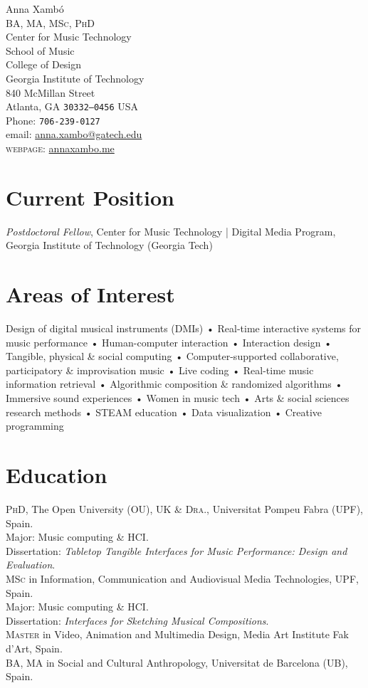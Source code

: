 \documentclass[10pt, a4paper]{article}
\newcommand{\years}[1]{\marginnote{\scriptsize #1}}
\begin{document}
{\Huge Anna Xambó}\\[0.1cm]
\textsc{BA, MA, MSc, PhD}\\[1cm]
Center for Music Technology\\
School of Music\\
College of Design\\
Georgia Institute of Technology\\
840 McMillan Street\\
Atlanta, GA  \texttt{30332--0456}
USA\\[.2cm]
Phone: \texttt{706-239-0127}\\
email: \href{mailto:anna.xambo@gatech.edu}{anna.xambo@gatech.edu}\\
\textsc{webpage}: \href{http://annaxambo.me/}{annaxambo.me}\\ 

\section*{Current Position}
\emph{Postdoctoral Fellow}, Center for Music Technology | Digital Media Program, Georgia Institute of Technology (Georgia Tech)

\section*{Areas of Interest}
Design of digital musical instruments (DMIs) • Real-time interactive systems for music performance • Human-computer interaction • Interaction design • Tangible, physical \& social computing • Computer-supported collaborative, participatory \& improvisation music • Live coding • Real-time music information retrieval • Algorithmic composition \& randomized algorithms • Immersive sound experiences • Women in music tech • Arts \& social sciences research methods • STEAM education • Data visualization • Creative programming 

\section*{Education}
\noindent
\years{2015}\textsc{PhD}, The Open University (OU), UK \& \textsc{Dra.}, Universitat Pompeu Fabra (UPF), Spain.\\
Major: Music computing \& HCI.\\ 
Dissertation: \emph{Tabletop Tangible Interfaces for Music Performance: Design and Evaluation}.\\
\years{2008}\textsc{MSc} in Information, Communication and Audiovisual Media Technologies, UPF, Spain.\\
Major: Music computing \& HCI.\\ 
Dissertation: \emph{Interfaces for Sketching Musical Compositions}.\\
\years{1999}\textsc{Master} in Video, Animation and Multimedia Design, Media Art Institute Fak d'Art, Spain.\\
\years{1996}\textsc{BA, MA} in Social and Cultural Anthropology, Universitat de Barcelona (UB), Spain.
\end{document}
